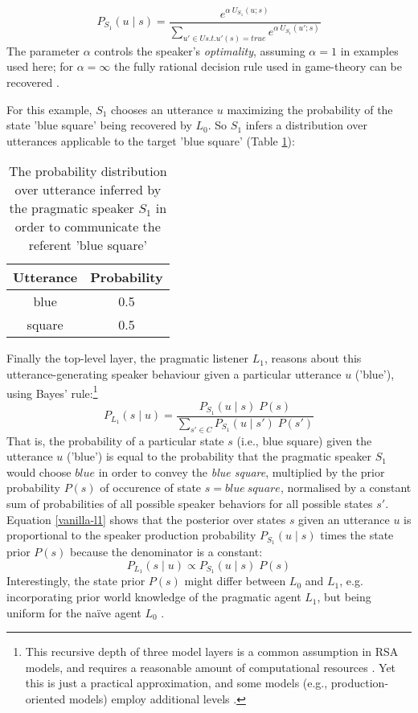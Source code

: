 \begin{equation}
P_{S_1}(u \mid s) = \frac{e^{\alpha \: U_{S_1} (u; s)}}{\sum_{u' \in U s.t. u'(s) = true} e^{\alpha \: U_{S_1} (u'; s)}}
\end{equation}
The parameter $\alpha$ controls the speaker's \emph{optimality}, assuming $\alpha = 1$ in examples used here; for $\alpha = \infty $ the fully rational decision rule used in game-theory can be recovered \parencite{problang, lassiter2017adjectival}.

For this example, $S_1$ chooses an utterance $u$ maximizing the probability of the state 'blue square' being recovered by $L_0$. So $S_1$ infers a distribution over utterances applicable to the target 'blue square' (Table \ref{rsa-s1}):

\begin{table}[h]
	\begin{center}
		\caption{The probability distribution over utterance inferred by the pragmatic speaker $S_1$ in order to communicate the referent 'blue square'}
		\label{rsa-s1}
		\vskip 0.12in
		\begin{tabular}{cc}
			Utterance & Probability \\
			\hline
			blue & 0.5 \\
			square & 0.5
		\end{tabular}
	\end{center}
\end{table}
 
Finally the top-level layer, the pragmatic listener $L_1$, reasons about this utterance-generating speaker behaviour given a particular utterance $u$ ('blue'), using Bayes' rule:\footnote{This recursive depth of three model layers is a common assumption in RSA models, and requires a reasonable amount of computational resources \parencite{lassiter2017adjectival}. Yet this is just a practical approximation, and some models (e.g., production-oriented models) employ additional levels \parencite{problang}.}
\begin{equation}
\label{vanilla-l1} 
P_{L_1}(s \mid u) = \frac{P_{S_1}(u \mid s) \; P(s)}{\sum_{s' \in C} P_{S_1}(u \mid s') \; P(s')}
\end{equation}
That is, the probability of a particular state $s$ (i.e., blue square) given the utterance $u$ ('blue') is equal to the probability that the pragmatic speaker $S_1$ would choose $blue$ in order to convey the \textit{blue square}, multiplied by the prior probability $P(s)$ of occurence of state $s = blue \:square$, normalised by a constant sum of probabilities of all possible speaker behaviors for all possible states $s'$. 
Equation \ref{vanilla-l1} shows that the posterior over states $s$ given an utterance $u$ is proportional to the speaker production probability $P_{S_1}(u \mid s)$ times the state prior $P(s)$ because the denominator is a constant: 
\begin{equation}
P_{L_1}(s \mid u) \propto P_{S_1}(u \mid s) \; P(s)
\end{equation} 
Interestingly, the state prior $P(s)$ might differ between $L_0$ and $L_1$, e.g. incorporating prior world knowledge of the pragmatic agent $L_1$, but being uniform for the na\"ive agent $L_0$ \parencite{problang}. 

